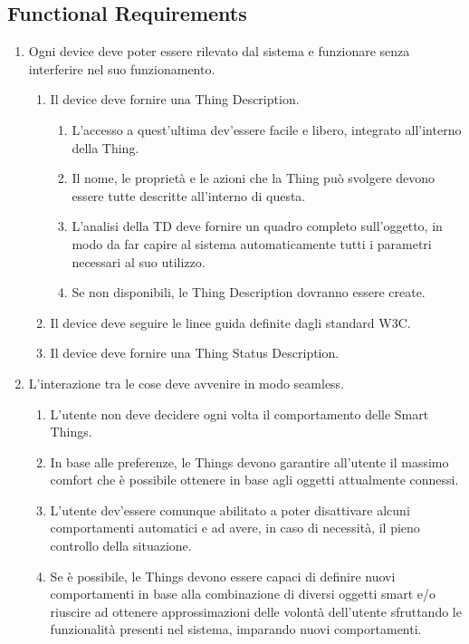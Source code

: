 \documentclass[12pt,a4paper,openright,oneside]{report}
\begin{document}
\subsection{Functional Requirements}
\begin{enumerate}
	\item Ogni device deve poter essere rilevato dal sistema e funzionare senza interferire nel suo funzionamento.
	\begin{enumerate}[label*=\arabic*.]
		\item Il device deve fornire una Thing Description.
		\begin{enumerate}[label*=\arabic*.]
			\item L'accesso a quest'ultima dev'essere facile e libero, integrato all'interno della Thing.
			\item Il nome, le proprietà e le azioni che la Thing può svolgere devono essere tutte descritte all'interno di questa.
			\item L'analisi della TD deve fornire un quadro completo sull'oggetto, in modo da far capire al sistema automaticamente tutti i parametri necessari al suo utilizzo.
			\item Se non disponibili, le Thing Description dovranno essere create.
		\end{enumerate}
		
		\item Il device deve seguire le linee guida definite dagli standard W3C.
		
		\item Il device deve fornire una Thing Status Description.
	\end{enumerate}
	
	\item L'interazione tra le cose deve avvenire in modo seamless.
	\begin{enumerate}[label*=\arabic*.]
		\item L'utente non deve decidere ogni volta il comportamento delle Smart Things.
		\item In base alle preferenze, le Things devono garantire all'utente il massimo comfort che è possibile ottenere in base agli oggetti attualmente connessi.
		\item L'utente dev'essere comunque abilitato a poter disattivare alcuni comportamenti automatici e ad avere, in caso di necessità, il pieno controllo della situazione.
		\item Se è possibile, le Things devono essere capaci di definire nuovi comportamenti in base alla combinazione di diversi oggetti smart e/o riuscire ad ottenere approssimazioni delle volontà dell'utente sfruttando le funzionalità presenti nel sistema, imparando nuovi comportamenti.
	\end{enumerate}
\end{enumerate}
\end{document}

